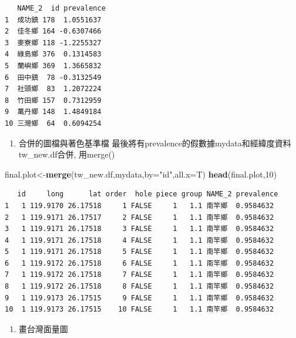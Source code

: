 \documentclass[]{book}
\newenvironment{Shaded}{\begin{snugshade}}{\end{snugshade}}
\newcommand{\KeywordTok}[1]{\textcolor[rgb]{0.13,0.29,0.53}{\textbf{{#1}}}}
\newcommand{\DataTypeTok}[1]{\textcolor[rgb]{0.13,0.29,0.53}{{#1}}}
\newcommand{\DecValTok}[1]{\textcolor[rgb]{0.00,0.00,0.81}{{#1}}}
\newcommand{\StringTok}[1]{\textcolor[rgb]{0.31,0.60,0.02}{{#1}}}
\newcommand{\NormalTok}[1]{{#1}}
\providecommand{\tightlist}{%
  \setlength{\itemsep}{0pt}\setlength{\parskip}{0pt}}
\theoremstyle{definition}
\theoremstyle{definition}
\theoremstyle{remark}
\begin{document}
\begin{verbatim}
   NAME_2  id prevalence
1  成功鎮 178  1.0551637
2  佳冬鄉 164 -0.6307466
3  麥寮鄉 118 -1.2255327
4  綠島鄉 376  0.1314583
5  蘭嶼鄉 369  1.3665832
6  田中鎮  78 -0.3132549
7  社頭鄉  83  1.2072224
8  竹田鄉 157  0.7312959
9  萬丹鄉 148  1.4849184
10 三灣鄉  64  0.6094254
\end{verbatim}

\begin{enumerate}
\def\labelenumi{\arabic{enumi}.}
\setcounter{enumi}{3}
\tightlist
\item
  合併的圖檔與著色基準檔
  最後將有prevalence的假數據mydata和經緯度資料tw\_new.df合併, 用merge()
\end{enumerate}

\begin{Shaded}
\begin{Highlighting}[]
\NormalTok{final.plot<-}\KeywordTok{merge}\NormalTok{(tw_new.df,mydata,}\DataTypeTok{by=}\StringTok{"id"}\NormalTok{,}\DataTypeTok{all.x=}\NormalTok{T)}
\KeywordTok{head}\NormalTok{(final.plot,}\DecValTok{10}\NormalTok{)}
\end{Highlighting}
\end{Shaded}

\begin{verbatim}
   id     long      lat order  hole piece group NAME_2 prevalence
1   1 119.9170 26.17518     1 FALSE     1   1.1 南竿鄉  0.9584632
2   1 119.9171 26.17517     2 FALSE     1   1.1 南竿鄉  0.9584632
3   1 119.9171 26.17518     3 FALSE     1   1.1 南竿鄉  0.9584632
4   1 119.9171 26.17518     4 FALSE     1   1.1 南竿鄉  0.9584632
5   1 119.9171 26.17518     5 FALSE     1   1.1 南竿鄉  0.9584632
6   1 119.9172 26.17518     6 FALSE     1   1.1 南竿鄉  0.9584632
7   1 119.9172 26.17518     7 FALSE     1   1.1 南竿鄉  0.9584632
8   1 119.9172 26.17518     8 FALSE     1   1.1 南竿鄉  0.9584632
9   1 119.9173 26.17515     9 FALSE     1   1.1 南竿鄉  0.9584632
10  1 119.9173 26.17515    10 FALSE     1   1.1 南竿鄉  0.9584632
\end{verbatim}

\begin{enumerate}
\def\labelenumi{\arabic{enumi}.}
\setcounter{enumi}{4}
\tightlist
\item
  畫台灣面量圖
\end{enumerate}
\end{document}
